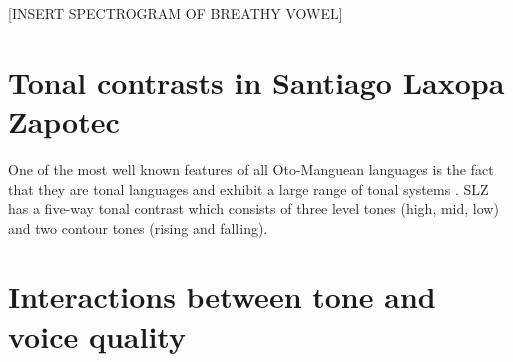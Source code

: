 [INSERT SPECTROGRAM OF BREATHY VOWEL]
\section{Tonal contrasts in Santiago Laxopa Zapotec} \label{sec:SLZ-tones}
One of the most well known features of all Oto-Manguean languages is the fact that they are tonal languages and exhibit a large range of tonal systems \citep{pikeProblemsZapotecTone1948,renschComparativeOtomangueanPhonology1976,josserandMixtecDialectHistory1983,silvermanLaryngealComplexityOtomanguean1997,beamdeazconaProblemsZapotecTone2007,dicanioItunyosoTrique2010,dicanioCoarticulationToneGlottal2012,elliottChicahuaxtlaTriqui2016,
campbellOtomangueanHistoricalLinguistics2017a,campbellOtomangueanHistoricalLinguistics2017b,
lillehaugenOtomangueanLanguages2019,eischensTonePhonationPhonologyPhonetics2022}. SLZ has a five-way tonal contrast which consists of three level tones (high, mid, low) and two contour tones (rising and falling). 

\citet{brinkerhoffTonalPatternsTheir2022}

\section{Interactions between tone and voice quality} \label{sec:SLZ-interaction}



